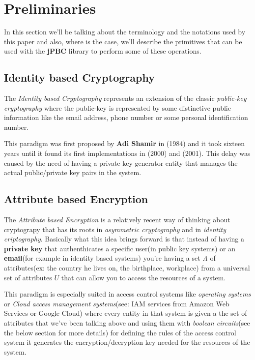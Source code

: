\documentclass[12pt]{article}
\begin{document}
\section{Preliminaries}

In this section we'll be talking about the terminology and the notations used by this paper and also, where is the case, we'll describe the primitives that can be used with the \textbf{jPBC} library to perform some of these operations.  

\subsection{Identity based Cryptography}

The \textit{Identity based Cryptography} represents an extension of the classic \textit{public-key cryptography} where the public-key is represented by some distinctive public information like the email address, phone number or some personal identification number.

This paradigm was first proposed by \textbf{Adi Shamir} in \cite{shamirid}(1984) and it took sixteen years until it found its first implementations in \cite{sok}(2000) and \cite{bf}(2001). This delay was caused by the need of having a private key generator entity that manages the actual public/private key pairs in the system. 

\subsection{Attribute based Encryption}

The \textit{Attribute based Encryption} is a relatively recent way of thinking about cryptograpy that has its roots in \textit{asymmetric cryptography} and in \textit{identity criptography}. Basically what this idea brings forward is that instead of having a \textbf{private key} that authenthicates a specific user(in public key systems) or an \textbf{email}(for example in identity based systems) you're having a set \textit{A} of attributes(ex: the country he lives on, the birthplace, workplace) from a universal set of attributes $U$ that can allow you to access the resources of a system. 

This paradigm is especially suited in access control systems like \textit{operating systems} or \textit{Cloud access management systems}(see: IAM services from Amazon Web Services or Google Cloud) where every entity in that system is given a the set of attributes that we've been talking above and using them with \textit{boolean circuits}(see the below section for more details) for defining the rules of the access control system it generates the encryption/decryption key needed for the resources of the system.  
\end{document}
